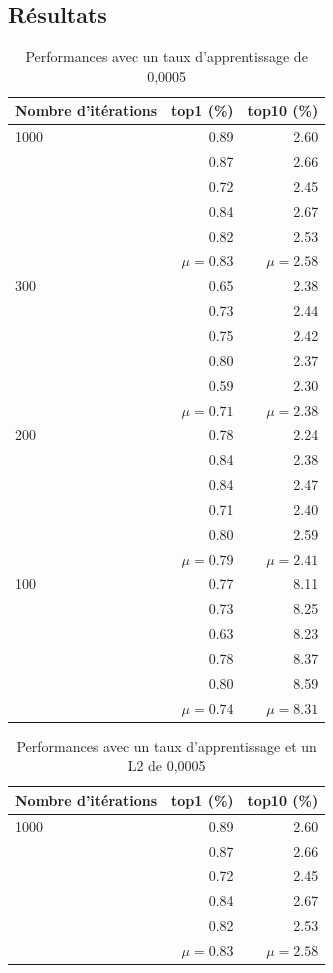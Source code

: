 \documentclass{article}
\begin{document}
\subsection{Résultats}
\begin{table}[htbp]
\centering
\begin{tabular}{lrr}  
\toprule
Nombre d'itérations & top1 (\%) & top10 (\%) \\
\midrule
1000 & 0.89 & 2.60 \\
         & 0.87 & 2.66 \\
         & 0.72 & 2.45 \\
         & 0.84 & 2.67 \\
         & 0.82 & 2.53 \\
         & $\mu = 0.83$ &  $\mu = 2.58$ \\
300   & 0.65 & 2.38 \\
         & 0.73 & 2.44 \\
         & 0.75 & 2.42 \\
         & 0.80 & 2.37 \\
         & 0.59 & 2.30 \\
         & $\mu = 0.71$ &  $\mu = 2.38$ \\
200   & 0.78 & 2.24 \\
         & 0.84 & 2.38 \\
         & 0.84 & 2.47 \\
         & 0.71 & 2.40 \\
         & 0.80 & 2.59 \\
         & $\mu = 0.79$ &  $\mu = 2.41$ \\
100   & 0.77 & 8.11 \\
         & 0.73 & 8.25 \\
         & 0.63 & 8.23 \\
         & 0.78 & 8.37 \\
         & 0.80 & 8.59 \\
         & $\mu = 0.74$ &  $\mu = 8.31$ \\
\bottomrule
\end{tabular}
\caption{Performances avec un taux d'apprentissage de 0,0005}
\label{tab:1}
\end{table}

\begin{table}[htbp]
\centering
\begin{tabular}{lrr}  
\toprule
Nombre d'itérations & top1 (\%) & top10 (\%) \\
\midrule
1000 & 0.89 & 2.60 \\
         & 0.87 & 2.66 \\
         & 0.72 & 2.45 \\
         & 0.84 & 2.67 \\
         & 0.82 & 2.53 \\
         & $\mu = 0.83$ &  $\mu = 2.58$ \\
\bottomrule
\end{tabular}
\caption{Performances avec un taux d'apprentissage et un L2 de 0,0005}
\label{tab:2}
\end{table}
\end{document}
